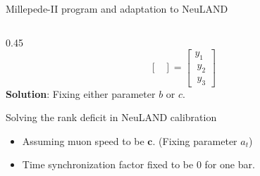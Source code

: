 \documentclass{ikpKoeln}
\begin{document}
\begin{frame}[t]{Millepede-II program and adaptation to NeuLAND \footnotemark}
\begin{columns}[t]
\begin{column}{0.45 \textwidth}
{\begin{equation*}
\begin{bmatrix}
				\end{bmatrix} = \begin{bmatrix}
					y_1 \\\ y_2 \\\ y_3
				\end{bmatrix}
			\end{equation*}
			\textbf{Solution}: Fixing either parameter $b$ or $c$.
			}
			{
			\vspace{-0.5em}
			\begin{block}{\small Solving the rank deficit in NeuLAND calibration}
				\begin{itemize}
					\item Assuming muon speed to be $\mathbf{c}$. (Fixing parameter $a_t$)
					\item Time synchronization factor fixed to be 0 for one bar.
				\end{itemize}
			\end{block}
			}

		\end{column}
	\end{columns}

\end{frame}
\end{document}
